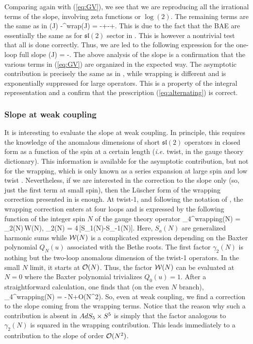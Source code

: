 \ea
Comparing again with (\ref{eq:GV}), we see that we are reproducing all the irrational terms of the slope, involving zeta functions or $\log(2)$. The remaining terms 
are the same as in \ads
\beq
\sigma(\mc J) -\sigma^{\rm wrap}(\mc J) = -+-+\cdots.
\eeq
This is due to the fact that the BAE are essentially the same as for $\mathfrak{sl}(2)$ sector in \ads. 
This is however a nontrivial test that all is done correctly.
Thus, we are led to the following expression for the one-loop full slope 
\beq
\sigma(\mc J) = -\left[\frac{1}{\mc J^{2}+1}+\sum_{n=-\infty}^{\infty}\frac{(-1)^{n}}{
\sqrt{\mc J^{4}+(n^{2}+1)\,\mc J^{2}+n^{2}}}
\right].
\eeq
The above analysis of the slope is a confirmation  that the various terms in (\ref{eq:GV}) are organized in the expected way. The asymptotic contribution is precisely the same as in \ads, while wrapping is different and is exponentially
suppressed for large operators. This is a property of the integral representation and a confirm that the 
prescription (\ref{eq:alternating}) is correct.

\subsubsection{Slope at weak coupling}

It is interesting to evaluate the slope at weak coupling.
 In principle, this  requires the knowledge of the anomalous dimensions of 
short $\mathfrak{sl}(2)$ operators in closed form as a function of the spin at a certain length ({\em i.e.} twist, in the gauge theory
dictionary). This information is 
available for the asymptotic contribution, but not for the wrapping, which is only known as a series expansion 
at large spin and low twist \cite{Beccaria:2009ny,Beccaria:2010kd}.
 Nevertheless, if we are interested in the correction to the slope only (so, just the first term at small spin), then the L\"uscher form of the wrapping correction
presented in \cite{Beccaria:2009ny} is enough. 
At twist-1, and following the notation of \cite{Beccaria:2009ny}, the wrapping correction enters at four loops
and is expressed by the following function of the integer spin $N$ of the gauge theory operator
\beq
\gamma_{4}^{\rm wrapping}(N) = \gamma_{2}(N)\,\mc W(N),
\qquad \gamma_{2}(N) = 4\,[S_{1}(N)-S_{-1}(N)].
\eeq
Here, $S_{a}(N)$ are generalized harmonic sums while $\mathcal W(N)$ is a complicated expression depending on the 
Baxter polynomial $Q_{N}(u)$ associated with the Bethe roots. The first factor $\gamma_{2}(N)$ 
is nothing but the two-loop
anomalous dimension of the twist-1 operators. In the small $N$ limit, it starts at $\mathcal O(N)$. Thus, the 
factor $\mathcal W(N)$ can be evaluated at $N=0$ where the Baxter polynomial trivializes $Q_{0}(u)=1$.
After a straightforward calculation, one finds that (on the even $N$ branch),
\beq
\gamma_{4}^{\rm wrapping}(N) = -\,N+\mc O(N^{2}).
\eeq
So, even at weak coupling, we find a correction to the slope coming from the wrapping 
terms.
Notice that  the reason why such a contribution is absent in $AdS_5 \times S^5$ is simply that the factor analogous to $\gamma_{2}(N)$ is squared in the wrapping contribution. 
This leads immediately to a contribution to the slope of order $\mathcal O(N^{2})$.


